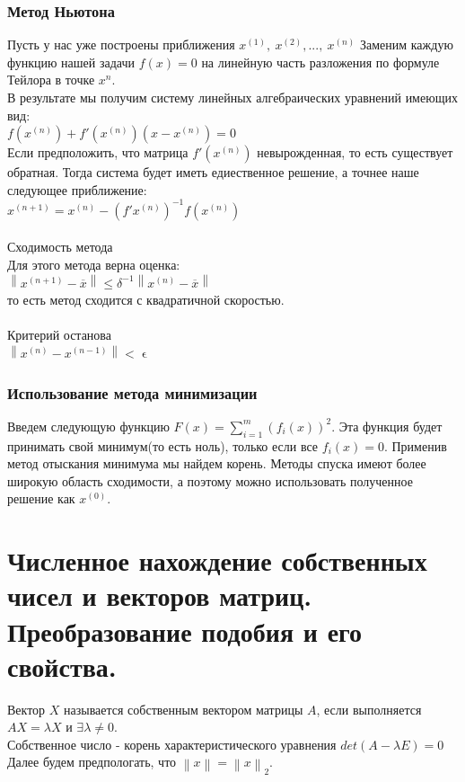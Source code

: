 \documentclass[16pt]{article}
\begin{document}
            \subsubsection{Метод Ньютона}
            Пусть у нас уже построены приближения $x^{(1)},\ x^{(2)},...,\ x^{(n)}$ Заменим каждую функцию нашей задачи $f(x) = 0$ на линейную часть разложения по формуле Тейлора в точке $x^{n}$.\\
            В результате мы получим систему линейных алгебраических уравнений имеющих вид:\\
            $f(x^{(n)}) + f'(x^{(n)})(x-x^{(n)})=0$\\
            Если предположить, что матрица $f'(x^{(n)})$ невырожденная, то есть существует обратная. Тогда система будет иметь едиественное решение, а точнее наше следующее приближение:\\
            $x^{(n+1)}=x^{(n)}-(f'x^{(n)})^{-1}f(x^{(n)})$\\ \\
            Сходимость метода\\
            Для этого метода верна оценка:\\
            $\left\|x^{(n+1)} - \overline{x}\right\|  \leq \delta^{-1} \left\|x^{(n)} - \overline{x}\right\|$\\
            то есть метод сходится с квадратичной скоростью.\\ \\
            Критерий останова\\
            $\left\|x^{(n)} - x^{(n-1)}\right\|<\upvarepsilon$\\
            \subsubsection{Использование метода минимизации}
            Введем следующую функцию $F(x) = \sum_{i=1}^{m}(f_i(x))^2$. Эта функция будет принимать свой минимум(то есть ноль), только если все $f_i(x)=0$.
            Применив метод отыскания минимума мы найдем корень. Методы спуска имеют более широкую область сходимости, а поэтому можно использовать полученное решение как $x^{(0)}$.
                        
		\section{Численное нахождение собственных чисел и векторов матриц. Преобразование подобия и его свойства.}
            Вектор $X$ называется собственным вектором матрицы $A$, если выполняется $AX=\lambda X$ и $\exists \lambda \neq 0$.\\
            Собственное число - корень характеристического уравнения $det(A-\lambda E) =0 $\\
            Далее будем предпологать, что $\left\|x\right\| = \left\|x\right\|_2$.\\
\end{document}
